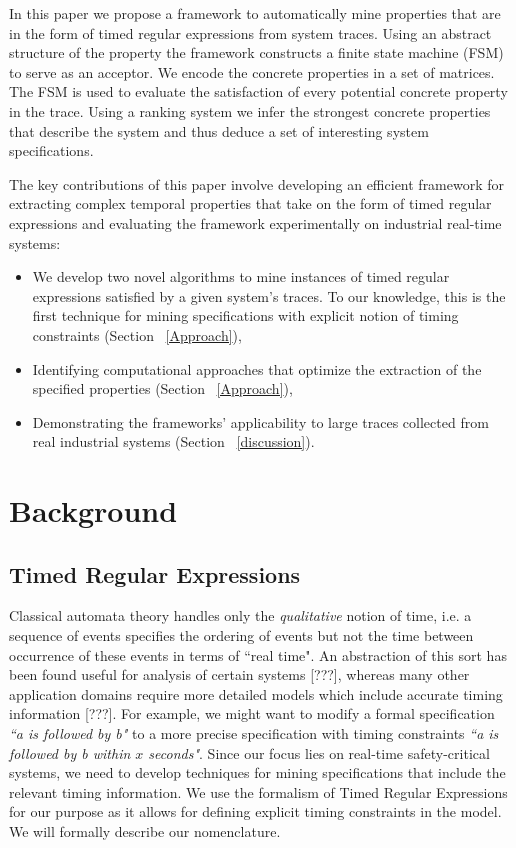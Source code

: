 \documentclass[]{sigplanconf}
\begin{document}
In this paper we propose a framework to automatically mine properties that are in the form of timed regular expressions from system traces. Using an abstract structure of the property the framework constructs a finite state machine (FSM) to serve as an acceptor. We encode the concrete properties in a set of matrices. The FSM is used to evaluate the satisfaction of every potential concrete property in the trace. Using a ranking system we infer the strongest concrete properties that describe the system and thus deduce a set of interesting system specifications.

The key contributions of this paper involve developing an efficient framework for extracting complex temporal properties that take on the form of timed regular expressions and evaluating the framework experimentally on industrial real-time systems:

\begin{itemize}
\item We develop two novel algorithms to mine instances of timed regular expressions satisfied by a given system's traces. To our knowledge, this is the first technique for mining specifications with explicit notion of timing constraints (Section ~\ref{Approach}),
\item Identifying computational approaches that optimize the extraction of the specified properties (Section ~\ref{Approach}),
\item Demonstrating the frameworks' applicability to large traces collected from real industrial systems  (Section ~\ref{discussion}).
\end{itemize}

\section{Background} \label{Background}

\subsection{Timed Regular Expressions}

Classical automata theory handles only the \emph{qualitative} notion of time, i.e. a sequence of events specifies the ordering of events but not the time between occurrence of these events in terms of ``real time". An abstraction of this sort has been found useful for analysis of certain systems [???], whereas many other application domains require more detailed models which include accurate timing information [???]. For example, we might want to modify a formal specification \emph{``a is followed by b"} to a more precise specification with timing constraints \emph{``a is followed by b within $x$ seconds"}. Since our focus lies on real-time safety-critical systems, we need to develop techniques for mining specifications that include the relevant timing information. We use the formalism of Timed Regular Expressions for our purpose as it allows for defining explicit timing constraints in the model. We will formally describe our nomenclature.
\end{document}
